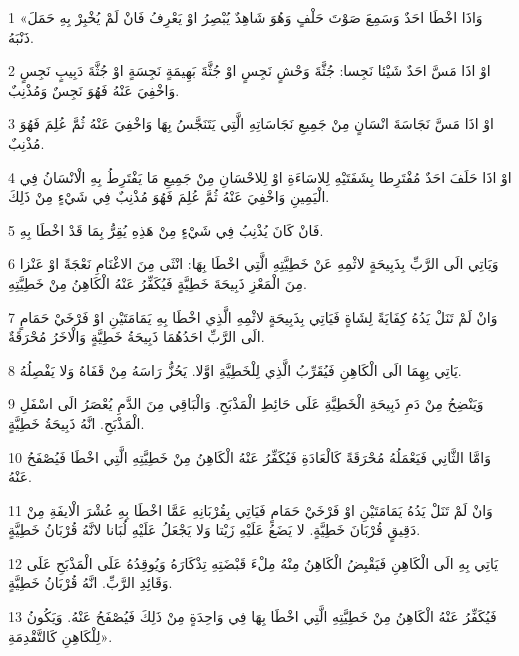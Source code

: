 \par 1 «وَاذَا اخْطَا احَدٌ وَسَمِعَ صَوْتَ حَلْفٍ وَهُوَ شَاهِدٌ يُبْصِرُ اوْ يَعْرِفُ فَانْ لَمْ يُخْبِرْ بِهِ حَمَلَ ذَنْبَهُ.
\par 2 اوْ اذَا مَسَّ احَدٌ شَيْئا نَجِسا: جُثَّةَ وَحْشٍ نَجِسٍ اوْ جُثَّةَ بَهِيمَةٍ نَجِسَةٍ اوْ جُثَّةَ دَبِيبٍ نَجِسٍ وَاخْفِيَ عَنْهُ فَهُوَ نَجِسٌ وَمُذْنِبٌ.
\par 3 اوْ اذَا مَسَّ نَجَاسَةَ انْسَانٍ مِنْ جَمِيعِ نَجَاسَاتِهِ الَّتِي يَتَنَجَّسُ بِهَا وَاخْفِيَ عَنْهُ ثُمَّ عُلِمَ فَهُوَ مُذْنِبٌ.
\par 4 اوْ اذَا حَلَفَ احَدٌ مُفْتَرِطا بِشَفَتَيْهِ لِلاسَاءَةِ اوْ لِلاحْسَانِ مِنْ جَمِيعِ مَا يَفْتَرِطُ بِهِ الْانْسَانُ فِي الْيَمِينِ وَاخْفِيَ عَنْهُ ثُمَّ عُلِمَ فَهُوَ مُذْنِبٌ فِي شَيْءٍ مِنْ ذَلِكَ.
\par 5 فَانْ كَانَ يُذْنِبُ فِي شَيْءٍ مِنْ هَذِهِ يُقِرُّ بِمَا قَدْ اخْطَا بِهِ.
\par 6 وَيَاتِي الَى الرَّبِّ بِذَبِيحَةٍ لاثْمِهِ عَنْ خَطِيَّتِهِ الَّتِي اخْطَا بِهَا: انْثَى مِنَ الاغْنَامِ نَعْجَةً اوْ عَنْزا مِنَ الْمَعْزِ ذَبِيحَةَ خَطِيَّةٍ فَيُكَفِّرُ عَنْهُ الْكَاهِنُ مِنْ خَطِيَّتِهِ.
\par 7 وَانْ لَمْ تَنَلْ يَدُهُ كِفَايَةً لِشَاةٍ فَيَاتِي بِذَبِيحَةٍ لاثْمِهِ الَّذِي اخْطَا بِهِ يَمَامَتَيْنِ اوْ فَرْخَيْ حَمَامٍ الَى الرَّبِّ احَدُهُمَا ذَبِيحَةُ خَطِيَّةٍ وَالْاخَرُ مُحْرَقَةٌ.
\par 8 يَاتِي بِهِمَا الَى الْكَاهِنِ فَيُقَرِّبُ الَّذِي لِلْخَطِيَّةِ اوَّلا. يَحُزُّ رَاسَهُ مِنْ قَفَاهُ وَلا يَفْصِلُهُ.
\par 9 وَيَنْضِحُ مِنْ دَمِ ذَبِيحَةِ الْخَطِيَّةِ عَلَى حَائِطِ الْمَذْبَحِ. وَالْبَاقِي مِنَ الدَّمِ يُعْصَرُ الَى اسْفَلِ الْمَذْبَحِ. انَّهُ ذَبِيحَةُ خَطِيَّةٍ.
\par 10 وَامَّا الثَّانِي فَيَعْمَلُهُ مُحْرَقَةً كَالْعَادَةِ فَيُكَفِّرُ عَنْهُ الْكَاهِنُ مِنْ خَطِيَّتِهِ الَّتِي اخْطَا فَيُصْفَحُ عَنْهُ.
\par 11 وَانْ لَمْ تَنَلْ يَدُهُ يَمَامَتَيْنِ اوْ فَرْخَيْ حَمَامٍ فَيَاتِي بِقُرْبَانِهِ عَمَّا اخْطَا بِهِ عُشْرَ الْايفَةِ مِنْ دَقِيقٍ قُرْبَانَ خَطِيَّةٍ. لا يَضَعُ عَلَيْهِ زَيْتا وَلا يَجْعَلُ عَلَيْهِ لُبَانا لانَّهُ قُرْبَانُ خَطِيَّةٍ.
\par 12 يَاتِي بِهِ الَى الْكَاهِنِ فَيَقْبِضُ الْكَاهِنُ مِنْهُ مِلْءَ قَبْضَتِهِ تِذْكَارَهُ وَيُوقِدُهُ عَلَى الْمَذْبَحِ عَلَى وَقَائِدِ الرَّبِّ. انَّهُ قُرْبَانُ خَطِيَّةٍ.
\par 13 فَيُكَفِّرُ عَنْهُ الْكَاهِنُ مِنْ خَطِيَّتِهِ الَّتِي اخْطَا بِهَا فِي وَاحِدَةٍ مِنْ ذَلِكَ فَيُصْفَحُ عَنْهُ. وَيَكُونُ لِلْكَاهِنِ كَالتَّقْدِمَةِ».
